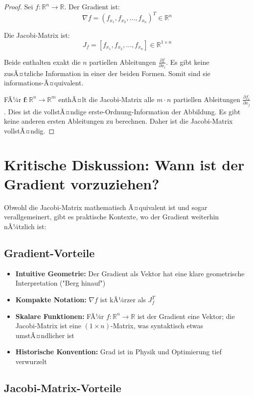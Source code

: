 ﻿\documentclass[a4paper,12pt]{article}
\theoremstyle{definition}
\begin{document}
\begin{proof}
	Sei $f: \mathbb{R}^n \to \mathbb{R}$. Der Gradient ist:
	\[
	\nabla f = (f_{x_1}, f_{x_2}, \ldots, f_{x_n})^T \in \mathbb{R}^n
	\]
	
	Die Jacobi-Matrix ist:
	\[
	J_f = [f_{x_1}, f_{x_2}, \ldots, f_{x_n}] \in \mathbb{R}^{1 \times n}
	\]
	
	Beide enthalten exakt die $n$ partiellen Ableitungen $\frac{\partial f}{\partial x_i}$. Es gibt keine zusÃ¤tzliche Information in einer der beiden Formen. Somit sind sie informations-Ã¤quivalent.
	
	FÃ¼r $\boldsymbol{f}: \mathbb{R}^n \to \mathbb{R}^m$ enthÃ¤lt die Jacobi-Matrix alle $m \cdot n$ partiellen Ableitungen $\frac{\partial f_i}{\partial x_j}$. Dies ist die vollstÃ¤ndige erste-Ordnung-Information der Abbildung. Es gibt keine anderen ersten Ableitungen zu berechnen. Daher ist die Jacobi-Matrix vollstÃ¤ndig.
\end{proof}

\newpage

\section{Kritische Diskussion: Wann ist der Gradient vorzuziehen?}

Obwohl die Jacobi-Matrix mathematisch Ã¤quivalent ist und sogar verallgemeinert, gibt es praktische Kontexte, wo der Gradient weiterhin nÃ¼tzlich ist:

\subsection{Gradient-Vorteile}

\begin{itemize}
	\item \textbf{Intuitive Geometrie:} Der Gradient als Vektor hat eine klare geometrische Interpretation ("Berg hinauf")
	\item \textbf{Kompakte Notation:} $\nabla f$ ist kÃ¼rzer als $J_f^T$
	\item \textbf{Skalare Funktionen:} FÃ¼r $f: \mathbb{R}^n \to \mathbb{R}$ ist der Gradient eine Vektor; die Jacobi-Matrix ist eine $(1 \times n)$-Matrix, was syntaktisch etwas umstÃ¤ndlicher ist
	\item \textbf{Historische Konvention:} Grad ist in Physik und Optimierung tief verwurzelt
\end{itemize}

\subsection{Jacobi-Matrix-Vorteile}
\end{document}
